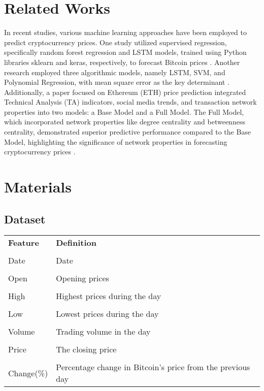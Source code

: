 \documentclass{ieeeojies}
\begin{document}
\section{Related Works}

In recent studies, various machine learning approaches have been employed to predict cryptocurrency prices. One study utilized supervised regression, specifically random forest regression and LSTM models, trained using Python libraries sklearn and keras, respectively, to forecast Bitcoin prices \cite{b1}. Another research employed three algorithmic models, namely LSTM, SVM, and Polynomial Regression, with mean square error as the key determinant \cite{b2}. Additionally, a paper focused on Ethereum (ETH) price prediction integrated Technical Analysis (TA) indicators, social media trends, and transaction network properties into two models: a Base Model and a Full Model. The Full Model, which incorporated network properties like degree centrality and betweenness centrality, demonstrated superior predictive performance compared to the Base Model, highlighting the significance of network properties in forecasting cryptocurrency prices \cite{b3}.

\section{Materials}
\subsection{Dataset}
\begin{table}[H]
\centering
\begin{tabular}{l l}
 \textbf{Feature} & \textbf{Definition} \\ \\
 Date & Date \\ \\
 Open & Opening prices\\ \\
 High & Highest prices during the day \\ \\
 Low & Lowest prices during the day\\ \\
 Volume & Trading volume in the day\\ \\
Price & The closing price\\ \\
 Change(\%) & Percentage change in Bitcoin's price from the previous day\\
\end{tabular}
\end{table}
\end{document}
